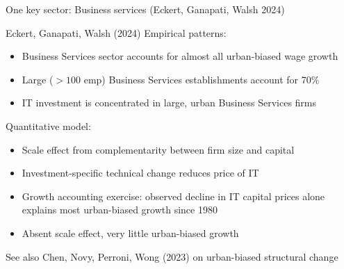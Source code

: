 \documentclass[11pt,notes=hide,aspectratio=169]{beamer}
\begin{document}
\begin{frame}{One key sector: Business services (Eckert, Ganapati, Walsh 2024)}
\begin{center}
\end{center}
\end{frame}
\begin{frame}{Eckert, Ganapati, Walsh (2024)}
Empirical patterns:
\begin{itemize}
\item Business Services sector accounts for almost all urban-biased wage growth
\item Large ($>100$ emp) Business Services establishments account for 70\%
\item IT investment is concentrated in large, urban Business Services firms
\end{itemize}
Quantitative model:
\begin{itemize}
\item Scale effect from complementarity between firm size and capital
\item Investment-specific technical change reduces price of IT
\item Growth accounting exercise: observed decline in IT capital prices alone explains most urban-biased growth since 1980
\item Absent scale effect, very little urban-biased growth
\end{itemize}
See also Chen, Novy, Perroni, Wong (2023) on urban-biased structural change
\end{frame}
\end{document}
